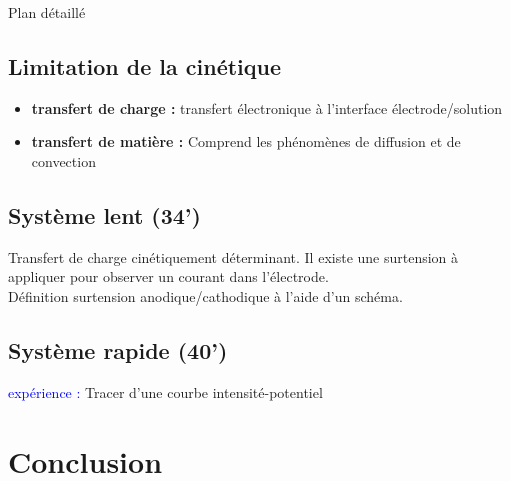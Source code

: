 \begin{reportBlock}{Plan détaillé}
\subsection{Limitation de la cinétique}
\begin{itemize}
    \item \textbf{transfert de charge :} transfert électronique à l'interface électrode/solution
    \item \textbf{transfert de matière :} Comprend les phénomènes de diffusion et de convection 
\end{itemize}

\subsection{Système lent (34')}
Transfert de charge cinétiquement déterminant. Il existe une surtension à appliquer pour observer un courant dans l'électrode.\\
Définition surtension anodique/cathodique à l'aide d'un schéma.
\subsection{Système rapide (40')}
\textcolor{blue}{expérience :} Tracer d'une courbe intensité-potentiel 
\section{Conclusion} 


\end{reportBlock}